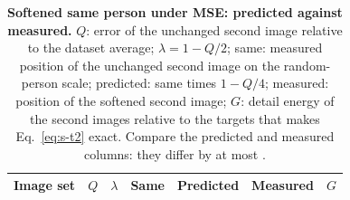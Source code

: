 \begin{table}[htbp]
\centering
\caption{\textbf{Softened same person under \acs{MSE}: predicted against measured.}
$Q$: error of the unchanged second image relative to the dataset average; $\lambda=1-Q/2$; same: measured position of the unchanged second image on the random-person scale; predicted: same times $1-Q/4$; measured: position of the softened second image; $G$: detail energy of the second images relative to the targets that makes Eq.~\ref{eq:s-t2} exact.
Compare the predicted and measured columns: they differ by at most \tTwoMaxDiff{}.}
\label{tab:s-t2}
\small
\begin{tabular}{@{}lrrrrrr@{}}
\toprule
Image set & $Q$ & $\lambda$ & Same & Predicted & Measured & $G$ \\
\midrule
\end{tabular}
\end{table}
